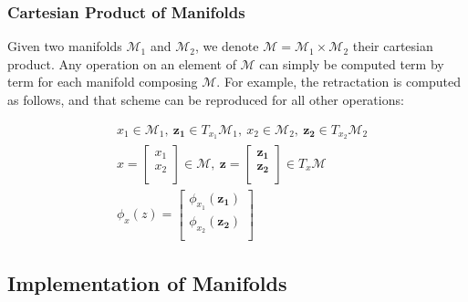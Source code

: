 \subsubsection{Cartesian Product of Manifolds}
\label{ssub:cartesian_product_of_manifolds}
Given two manifolds $\mathcal{M}_1$ and $\mathcal{M}_2$, we denote $\mathcal{M}=\mathcal{M}_1\times\mathcal{M}_2$ their cartesian product.
Any operation on an element of $\mathcal{M}$ can simply be computed term by term for each manifold composing $\mathcal{M}$.
For example, the retractation is computed as follows, and that scheme can be reproduced for all other operations:

\begin{align}
  &x_1\in \mathcal{M}_1,\ \mathbf{z_1}\in T_{x_1}\mathcal{M}_1,\ x_2\in \mathcal{M}_2,\ \mathbf{z_2}\in T_{x_2}\mathcal{M}_2\\
  &x=\begin{bmatrix}
    x_1\\x_2\\
  \end{bmatrix}\in \mathcal{M},\ \mathbf{z}=\begin{bmatrix}
    \mathbf{z_1}\\ \mathbf{z_2}\\
  \end{bmatrix}\in T_x\mathcal{M}\\
  &\phi_x(z) = \begin{bmatrix}
    \phi_{x_1}(\mathbf{z_1})\\
    \phi_{x_2}(\mathbf{z_2})\\
  \end{bmatrix}
\end{align}


\subsection{Implementation of Manifolds}
\label{sub:implementation_of_manifolds}

